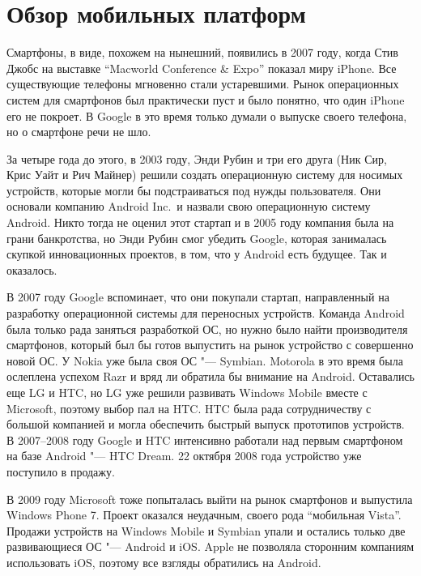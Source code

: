 \section{Обзор мобильных платформ}
\label{sec:platforms}
Смартфоны, в виде, похожем на нынешний, появились в 2007 году, когда Стив Джобс на выставке ``Macworld Conference \& Expo'' показал миру iPhone.
Все существующие телефоны мгновенно стали устаревшими.
Рынок операционных систем для смартфонов был практически пуст и было понятно, что один iPhone его не покроет.
В Google в это время только думали о выпуске своего телефона, но о смартфоне речи не шло.

За четыре года до этого, в 2003 году, Энди Рубин и три его друга (Ник Сир, Крис Уайт и Рич Майнер) решили создать операционную систему для носимых устройств, которые могли бы подстраиваться под нужды пользователя.
Они основали компанию Android Inc.\ и назвали свою операционную систему Android.
Никто тогда не оценил этот стартап и в 2005 году компания была на грани банкротства, но Энди Рубин смог убедить Google, которая занималась скупкой инновационных проектов, в том, что у Android есть будущее.
Так и оказалось.

В 2007 году Google вспоминает, что они покупали стартап, направленный на разработку операционной системы для переносных устройств.
Команда Android была только рада заняться разработкой ОС, но нужно было найти производителя смартфонов, который был бы готов выпустить на рынок устройство с совершенно новой ОС.
У Nokia уже была своя ОС "--- Symbian.
Motorola в это время была ослеплена успехом Razr и вряд ли обратила бы внимание на Android.
Оставались еще LG и HTC, но LG уже решили развивать Windows Mobile вместе с Microsoft, поэтому выбор пал на HTC\@.
HTC была рада сотрудничеству с большой компанией и могла обеспечить быстрый выпуск прототипов устройств.
В 2007--2008 году Google и HTC интенсивно работали над первым смартфоном на базе Android "--- HTC Dream.
22 октября 2008 года устройство уже поступило в продажу.


В 2009 году Microsoft тоже попыталась выйти на рынок смартфонов и выпустила Windows Phone 7.
Проект оказался неудачным, своего рода ``мобильная Vista''.
Продажи устройств на Windows Mobile и Symbian упали и остались только две развивающиеся ОС "--- Android и iOS\@.
Apple не позволяла сторонним компаниям использовать iOS, поэтому все взгляды обратились  на Android.

